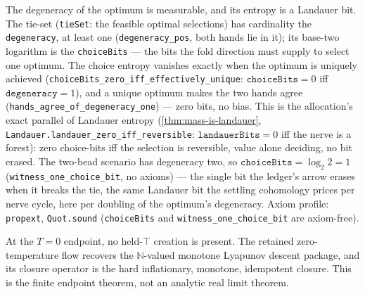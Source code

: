 \begin{theorem}\label{thm:tie-set-entropy}\leanok{}
The degeneracy of the optimum is measurable, and its entropy is a Landauer bit.
The tie-set (\texttt{tieSet}: the feasible optimal selections) has cardinality the
\texttt{degeneracy}, at least one (\texttt{degeneracy\_pos}, both hands lie in it);
its base-two logarithm is the \texttt{choiceBits} --- the bits the fold direction
must supply to select one optimum. The choice entropy vanishes exactly when the
optimum is uniquely achieved (\texttt{choiceBits\_zero\_iff\_effectively\_unique}:
\(\texttt{choiceBits} = 0\) iff \(\texttt{degeneracy} = 1\)), and a unique optimum
makes the two hands agree (\texttt{hands\_agree\_of\_degeneracy\_one}) --- zero
bits, no bias. This is the allocation's exact parallel of Landauer entropy
(\cref{thm:mass-is-landauer}, \texttt{Landauer.landauer\_zero\_iff\_reversible}:
\(\texttt{landauerBits} = 0\) iff the nerve is a forest): zero choice-bits iff the
selection is reversible, value alone deciding, no bit erased. The two-bead scenario
has degeneracy two, so \(\texttt{choiceBits} = \log_2 2 = 1\)
(\texttt{witness\_one\_choice\_bit}, no axioms) --- the single bit the ledger's arrow
erases when it breaks the tie, the same Landauer bit the settling cohomology prices
per nerve cycle, here per doubling of the optimum's degeneracy. Axiom profile:
\texttt{propext}, \texttt{Quot.sound} (\texttt{choiceBits} and
\texttt{witness\_one\_choice\_bit} are axiom-free).
\end{theorem}

\begin{theorem}\label{thm:zero-temperature-recovery}\leanok{}
At the \(T=0\) endpoint, no held-\(\top\) creation is present.  The retained
zero-temperature flow recovers the \(\mathbb{N}\)-valued monotone Lyapunov
descent package, and its closure operator is the hard inflationary,
monotone, idempotent closure.  This is the finite endpoint theorem, not an
analytic real limit theorem.
\end{theorem}

